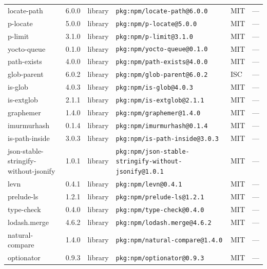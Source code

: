 \documentclass[11pt,a4paper]{article}
\begin{document}
\begin{longtable}{|p{4cm}|p{2cm}|p{1.6cm}|p{5cm}|p{1.5cm}|p{3.5cm}|}
\raggedright locate-path & 6.0.0 & library & \small\texttt{pkg:npm/locate-path@6.0.0} & MIT & \small — \\
\raggedright p-locate & 5.0.0 & library & \small\texttt{pkg:npm/p-locate@5.0.0} & MIT & \small — \\
\raggedright p-limit & 3.1.0 & library & \small\texttt{pkg:npm/p-limit@3.1.0} & MIT & \small — \\
\raggedright yocto-queue & 0.1.0 & library & \small\texttt{pkg:npm/yocto-queue@0.1.0} & MIT & \small — \\
\raggedright path-exists & 4.0.0 & library & \small\texttt{pkg:npm/path-exists@4.0.0} & MIT & \small — \\
\raggedright glob-parent & 6.0.2 & library & \small\texttt{pkg:npm/glob-parent@6.0.2} & ISC & \small — \\
\raggedright is-glob & 4.0.3 & library & \small\texttt{pkg:npm/is-glob@4.0.3} & MIT & \small — \\
\raggedright is-extglob & 2.1.1 & library & \small\texttt{pkg:npm/is-extglob@2.1.1} & MIT & \small — \\
\raggedright graphemer & 1.4.0 & library & \small\texttt{pkg:npm/graphemer@1.4.0} & MIT & \small — \\
\raggedright imurmurhash & 0.1.4 & library & \small\texttt{pkg:npm/imurmurhash@0.1.4} & MIT & \small — \\
\raggedright is-path-inside & 3.0.3 & library & \small\texttt{pkg:npm/is-path-inside@3.0.3} & MIT & \small — \\
\raggedright json-stable-stringify-without-jsonify & 1.0.1 & library & \small\texttt{pkg:npm/json-stable-stringify-without-jsonify@1.0.1} & MIT & \small — \\
\raggedright levn & 0.4.1 & library & \small\texttt{pkg:npm/levn@0.4.1} & MIT & \small — \\
\raggedright prelude-ls & 1.2.1 & library & \small\texttt{pkg:npm/prelude-ls@1.2.1} & MIT & \small — \\
\raggedright type-check & 0.4.0 & library & \small\texttt{pkg:npm/type-check@0.4.0} & MIT & \small — \\
\raggedright lodash.merge & 4.6.2 & library & \small\texttt{pkg:npm/lodash.merge@4.6.2} & MIT & \small — \\
\raggedright natural-compare & 1.4.0 & library & \small\texttt{pkg:npm/natural-compare@1.4.0} & MIT & \small — \\
\raggedright optionator & 0.9.3 & library & \small\texttt{pkg:npm/optionator@0.9.3} & MIT & \small — \\

\end{longtable}
\end{document}

